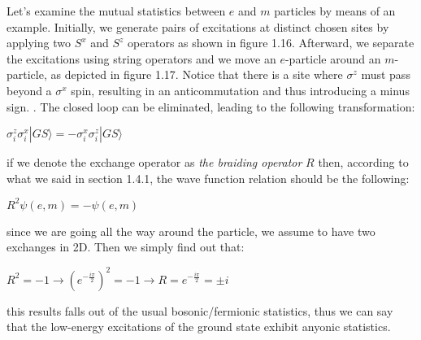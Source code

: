 \documentclass{Configuration_Files/PoliMi3i_thesis}
\begin{document}
Let's examine the mutual statistics between $e$ and $m$ particles by means of an example. Initially, we generate pairs of excitations at distinct chosen sites by applying two $S^x$ and $S^z$ operators as shown in figure 1.16. Afterward, we separate the excitations using string operators and we move an $e$-particle around an $m$-particle, as depicted in figure 1.17. Notice that there is a site where $\sigma^z$ must pass beyond a $\sigma^x$ spin, resulting in an anticommutation and thus introducing a minus sign. {\cite{Kit02}}.
The closed loop can be eliminated, leading to the following transformation:

\begin{center}
	$\sigma_i^z\sigma_i^x|GS\rangle = - \sigma_i^x\sigma_i^z|GS\rangle$
\end{center}

if we denote the exchange operator as {\it the braiding operator} $R$ then, according to what we said in section 1.4.1, the wave function relation should be the following:

\begin{center}
	$R^2\psi(e,m) = - \psi(e,m)$
\end{center}

since we are going all the way around the particle, we assume to have two exchanges in 2D. Then we simply find out that:

\begin{center}
	$R^2 = - 1 \rightarrow ( e^{-\frac{i\pi}{2}})^2 = - 1  \rightarrow R = e^{-\frac{i\pi}{2}} = \pm i $
\end{center}

this results falls out of the usual bosonic/fermionic statistics, thus we can say that the low-energy excitations of the ground state exhibit anyonic statistics.
\end{document}
